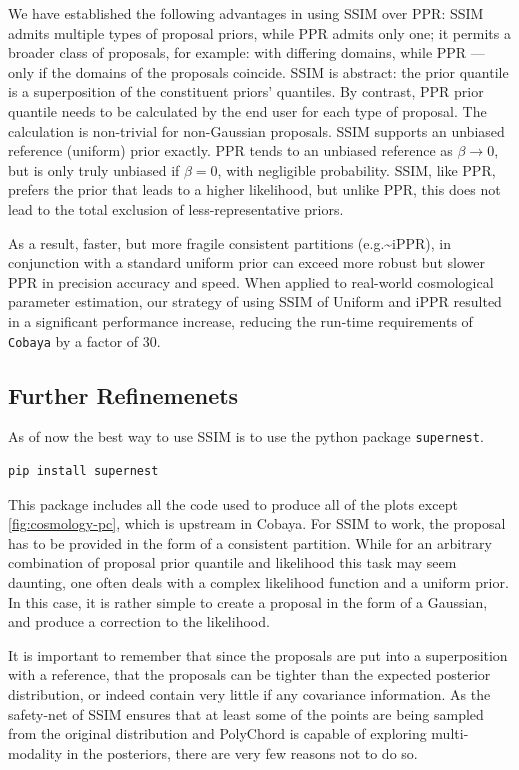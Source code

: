 \documentclass[draft,usenatbib]{mnras}
\begin{document}
We have established the following advantages in using SSIM over PPR:
SSIM admits multiple types of proposal priors, while PPR admits only
one; it permits a broader class of proposals, for example: with
differing domains, while PPR --- only if the domains of the proposals
coincide.  SSIM is abstract: the prior quantile is a superposition of
the constituent priors' quantiles. By contrast, PPR prior quantile
needs to be calculated by the end user for each type of proposal. The
calculation is non-trivial for non-Gaussian proposals. SSIM supports
an unbiased reference (uniform) prior exactly. PPR tends to an
unbiased reference as \(\beta\rightarrow 0\), but is only truly
unbiased if \(\beta=0\), with negligible probability. SSIM, like PPR,
prefers the prior that leads to a higher likelihood, but unlike PPR,
this does not lead to the total exclusion of less-representative
priors.


As a result, faster, but more fragile consistent partitions
(e.g.\textasciitilde{}iPPR), in conjunction with a standard uniform prior can exceed
more robust but slower PPR in precision accuracy and speed.  When
applied to real-world cosmological parameter estimation, our strategy
of using SSIM of Uniform and iPPR resulted in a significant
performance increase, reducing the run-time requirements of
\texttt{Cobaya} by a factor of 30.

\subsection{Further Refinemenets}
\label{sec:org36c706d}
As of now the best way to use SSIM is to use the python package
\texttt{supernest}.
\begin{verbatim}
pip install supernest
\end{verbatim}

This package includes all the code used to produce all of the plots
except \ref{fig:cosmology-pc}, which is upstream in Cobaya. For SSIM
to work, the proposal has to be provided in the form of a
consistent partition. While for an arbitrary combination of
proposal prior quantile and likelihood this task may seem daunting,
one often deals with a complex likelihood function and a uniform
prior. In this case, it is rather simple to create a proposal in
the form of a Gaussian, and produce a correction to the likelihood.

It is important to remember that since the proposals are put into a
superposition with a reference, that the proposals can be tighter
than the expected posterior distribution, or indeed contain very
little if any covariance information. As the safety-net of SSIM
ensures that at least some of the points are being sampled from the
original distribution and PolyChord is capable of exploring
multi-modality in the posteriors, there are very few reasons not to
do so.
\end{document}
